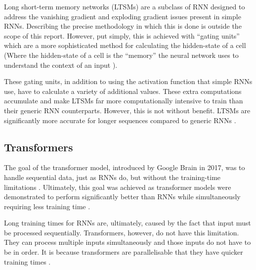 Long short-term memory networks (LTSMs) are a subclass of RNN designed to address the
vanishing gradient and exploding gradient issues present in simple RNNs. Describing the precise methodology
in which this is done is outside the scope of this report. However, put simply, this is achieved with ``gating units''
which are a more sophisticated method for calculating the hidden-state of a cell
(Where the hidden-state of a cell is the ``memory'' the neural network uses to understand the context of an input \cite{salem2022recurrent}).

These gating units, in addition to using the activation function that simple RNNs use, have to calculate a variety
of additional values. These extra computations accumulate and make LTSMs far more computationally intensive to train than
their generic RNN counterparts. However, this is not without benefit. LTSMs are significantly more accurate for longer
sequences compared to generic RNNs \cite{sundermeyer2012lstm}.


\subsection{Transformers}

The goal of the transformer model, introduced by Google Brain in 2017, was to handle sequential data, just as
RNNs do, but without the training-time limitations . Ultimately, this goal
was achieved as transformer models were demonstrated to perform significantly better than RNNs while
simultaneously requiring less training time \cite{DBLP:journals/corr/VaswaniSPUJGKP17}.

Long training times for RNNs are, ultimately, caused by the fact that input must be processed sequentially.
Transformers, however, do not have this limitation.
They can process multiple inputs simultaneously and those inputs do not have to be in order.
It is because transformers are parallelisable that they have quicker training times \cite{DBLP:journals/corr/VaswaniSPUJGKP17}.

